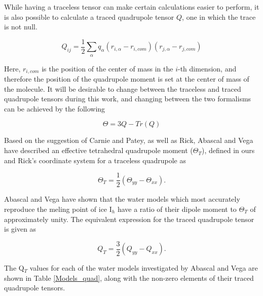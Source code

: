While having a traceless tensor can make certain calculations easier to 
perform, it is also possible to calculate a traced quadrupole tensor $Q$, one
in which the trace is not null.

\begin{equation}
Q_{ij} = \frac{1}{2}\sum_{\alpha}q_{\alpha}(r_{i,\alpha}-r_{i,com})(r_{j,\alpha}-r_{j,com})
\end{equation}

Here, $r_{i,com}$ is the position of the center of mass in the $i$-th 
dimension, and therefore the position of the quadrupole moment is set at the 
center of mass of the molecule. It will be desirable to change between the
traceless and traced quadrupole tensors during this work, and changing 
between the two formalisms can be achieved by the following

\begin{equation}
\Theta = 3Q - Tr(Q)
\end{equation}    

Based on the suggestion of Carnie and Patey\cite{Carnie1982}, 
as well as Rick\cite{Rick2004}, Abascal and Vega have described an effective 
tetrahedral quadrupole moment ($\Theta_T$), defined in ours and Rick's 
coordinate 
system for a traceless quadrupole as

\begin{equation}
\Theta_{T} = \frac{1}{2}(\Theta_{yy} - \Theta_{xx}).
\end{equation} 

Abascal and Vega have shown that the water models which most accurately
reproduce the meling point of ice I$_h$ have a ratio of their dipole moment
to $\Theta_T$ of approximately unity. The equivalent expression for the 
traced quadrupole tensor is given as

\begin{equation}
Q_{T} = \frac{3}{2}(Q_{yy} - Q_{xx}).
\end{equation}
 
The Q$_T$ values for each of the water models
investigated by Abascal and Vega are shown in Table \ref{Models_quad}, along 
with the non-zero elements of their traced quadrupole tensors.

